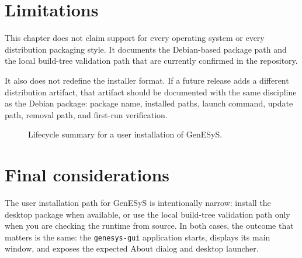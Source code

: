 \section{Limitations}
\label{sec:user-installation-limitations}

This chapter does not claim support for every operating system or every
distribution packaging style. It documents the Debian-based package path and
the local build-tree validation path that are currently confirmed in the
repository.

It also does not redefine the installer format. If a future release adds a
different distribution artifact, that artifact should be documented with the
same discipline as the Debian package: package name, installed paths, launch
command, update path, removal path, and first-run verification.

\begin{figure}[htbp]
    \centering



    \caption{Lifecycle summary for a user installation of GenESyS.}
    \label{fig:user-installation-structure-summary}
\end{figure}

\section{Final considerations}
\label{sec:user-installation-final-considerations}

The user installation path for GenESyS is intentionally narrow: install the
desktop package when available, or use the local build-tree validation path
only when you are checking the runtime from source. In both cases, the outcome
that matters is the same: the \texttt{genesys-gui} application starts, displays
its main window, and exposes the expected About dialog and desktop launcher.

